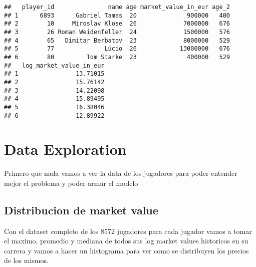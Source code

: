 \documentclass[
]{article}
\begin{document}
\begin{verbatim}
##   player_id               name age market_value_in_eur age_2
## 1      6893      Gabriel Tamas  20              900000   400
## 2        10     Miroslav Klose  26             7000000   676
## 3        26 Roman Weidenfeller  24             1500000   576
## 4        65   Dimitar Berbatov  23             8000000   529
## 5        77              Lúcio  26            13000000   676
## 6        80         Tom Starke  23              400000   529
##   log_market_value_in_eur
## 1                13.71015
## 2                15.76142
## 3                14.22098
## 4                15.89495
## 5                16.38046
## 6                12.89922
\end{verbatim}

\section{Data Exploration}\label{data-exploration}

Primero que nada vamos a ver la data de los jugadores para poder
entender mejor el problema y poder armar el modelo

\subsection{Distribucion de market
value}\label{distribucion-de-market-value}

Con el dataset completo de los 8572 jugadores para cada jugador vamos a
tomar el maximo, promedio y mediana de todos sus log market values
historicos en su carrera y vamos a hacer un histograma para ver como se
distribuyen los precios de los mismos.
\end{document}
